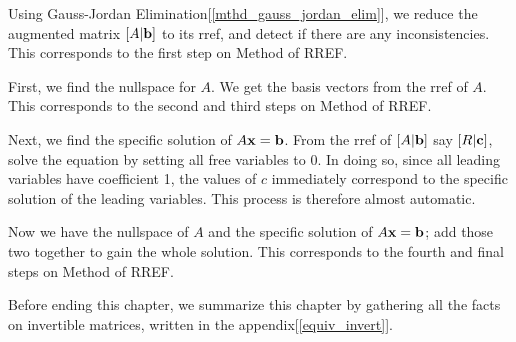 \documentclass{report}
\begin{document}
			Using Gauss-Jordan Elimination[\ref{mthd_gauss_jordan_elim}], we reduce the augmented matrix $\left[A|\bf{b}\right]$ to its rref, and detect if there are any inconsistencies. This corresponds to the first step on Method of RREF.
			
			First, we find the nullspace for $A$. We get the basis vectors from the rref of $A$. This corresponds to the second and third steps on Method of RREF.
			
			Next, we find the specific solution of $A\bf{x}=\bf{b}$. From the rref of $\left[A|\bf{b}\right]$ say $\left[R|\bf{c}\right]$, solve the equation by setting all free variables to 0. In doing so, since all leading variables have coefficient 1, the values of $c$ immediately correspond to the specific solution of the leading variables. This process is therefore almost automatic.
			
			Now we have the nullspace of $A$ and the specific solution of $A\bf{x}=\bf{b}$; add those two together to gain the whole solution. This corresponds to the fourth and final steps on Method of RREF.
		
	
	Before ending this chapter, we summarize this chapter by gathering all the facts on invertible matrices, written in the appendix[\ref{equiv_invert}].
\end{document}
